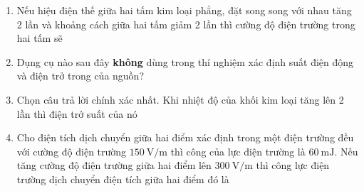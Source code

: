 \begin{enumerate}[label=\bfseries Câu \arabic*:]
\item Nếu hiệu điện thế giữa hai tấm kim loại phẳng, đặt song song với nhau tăng 2 lần và khoảng cách giữa hai tấm giảm 2 lần thì cường độ điện trường trong hai tấm sẽ 

\item Dụng cụ nào sau đây \textbf{không } dùng trong thí nghiệm xác định suất điện động và điện trở trong của nguồn?

\item Chọn câu trả lời chính xác nhất. Khi nhiệt độ của khối kim loại tăng lên 2 lần thì điện trở suất của nó

\item Cho điện tích dịch chuyển giữa hai điểm xác định trong một điện trường đều với cường độ điện trường $\SI{150}{\volt/\meter}$ thì công của lực điện trường là $\SI{60}{\milli\joule}$. Nếu tăng cường độ điện trường giữa hai điểm lên $\SI{300}{\volt/\meter}$ thì công lực điện trường dịch chuyển điện tích giữa hai điểm đó là 


\end{enumerate}
